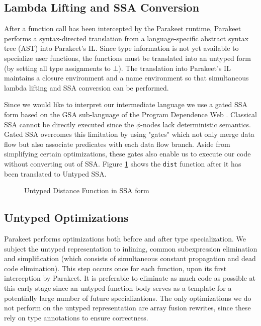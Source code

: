 \documentclass[preprint]{sigplanconf}
\begin{document}
\subsection{Lambda Lifting and SSA Conversion}
After a function call has been intercepted by the Parakeet runtime, Parakeet performs a syntax-directed translation from a language-specific abstract syntax tree (AST) into Parakeet's IL. Since type information is not yet available to specialize user functions, the functions must be translated into an untyped
form (by setting all type assignments to $\bot$). The translation into Parakeet's IL maintains a closure environment and a name environment so that simultaneous lambda lifting and SSA conversion can be performed.

Since we would like to interpret our intermediate language we use a gated SSA form based on the GSA sub-language of the Program Dependence Web \cite{Ott90}. Classical SSA cannot be directly executed since the $\phi$-nodes lack deterministic semantics. Gated SSA overcomes this limitation by using "gates" which not only merge data flow but also associate predicates with each data flow branch. Aside from simplifying certain optimizations, these gates also enable us to execute our code without converting out of SSA.  Figure \ref{UntypedSSADist} shows the \texttt{dist} function after it has been translated to Untyped SSA.

\begin{figure}[h!]
\caption{Untyped Distance Function in SSA form}
\label{UntypedSSADist}
\end{figure}

\subsection{Untyped Optimizations}
Parakeet performs optimizations both before and after type specialization. We subject the untyped representation to inlining, common subexpression elimination and simplification (which consists of simultaneous constant propagation and dead code elimination). This step occurs once for each function, upon its first interception by Parakeet. It is preferable to eliminate as much code as possible at this early stage since an untyped function body serves as a template for a potentially large number of future specializations. The only optimizations we do not perform on the untyped representation are array fusion rewrites, since these rely on type annotations to ensure correctness.
\end{document}
